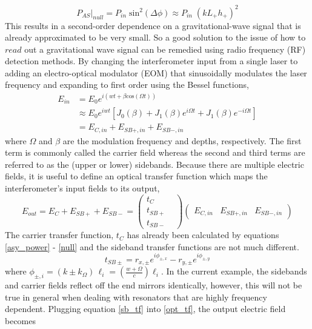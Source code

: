 			\begin{equation}\label{null}
			P_{AS} \vert_{null} = P_{in} \; \text{sin}^2 (\Delta \phi) \approx P_{in} \; (k L_{+} h_{+})^2 
			\end{equation}
		This results in a second-order dependence on a gravitational-wave signal that is already approximated to be very small.  So a good solution to the issue of how to $read$ out a gravitational wave signal can be remedied using radio frequency (RF) detection methods. By changing the interferometer input from a single laser to adding an electro-optical modulator (EOM) that sinusoidally modulates the laser frequency and expanding to first order using the Bessel functions,
			\begin{equation}\label{modE}
			\begin{aligned}
			E_{in} 	&= E_{0} e^{i(wt + \beta \text{cos} (\Omega t))} \\
					&\approx E_0 e^{iwt} [J_0(\beta) + J_1(\beta) e^{i \Omega t} + J_1(\beta) e^{-i \Omega t}] \\
					&= E_{C,in} + E_{SB+,in} + E_{SB-,in}
			\end{aligned}
			\end{equation}
		where $\Omega$ and $\beta$ are the modulation frequency and depths, respectively. The first term is commonly called the carrier field whereas the second and third terms are referred to as the (upper or lower) sidebands.  Because there are multiple electric fields, it is useful to define an optical transfer function which maps the interferometer's input fields to its output,
		\begin{equation}\label{opt_tf}
		E_{out} = E_{C} + E_{SB+} + E_{SB-} = 
		\begin{pmatrix}
			t_{C} 	&   
		\\ 	t_{SB+} &
		\\ 	t_{SB-} &
		\end{pmatrix}
		\begin{pmatrix}
		E_{C,in} &    E_{SB+,in}    &  E_{SB-,in}     
		\end{pmatrix}
		\end{equation}
		The carrier transfer function, $t_{C}$ has already been calculated by equations \ref{asy_power} - \ref{null} and the sideband transfer functions are not much different.
		\begin{equation}\label{sb_tf}
		t_{SB\pm} = r_{x,\pm}  e^{i\phi_{\pm,x}} - r_{y,\pm}  e^{i\phi_{\pm,y}}
		\end{equation}
		where $\phi_{\pm,i} = (k \pm k_{\Omega}) \, \ell_{i} = (\frac{w+\Omega}{c} ) \ell_{i}$. In the current example, the sidebands and carrier fields reflect off the end mirrors identically, however, this will not be true in general when dealing with resonators that are highly frequency dependent.  Plugging equation \ref{sb_tf} into \ref{opt_tf}, the output electric field becomes 
